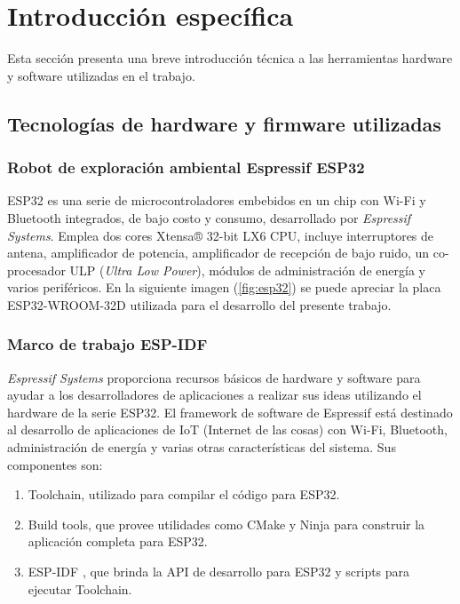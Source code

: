 \chapter{Introducción específica} %

\label{Chapter2}



Esta sección presenta una breve introducción técnica a las herramientas hardware y software utilizadas en el trabajo.

\section{Tecnologías de hardware y firmware utilizadas}


\subsection{Robot de exploración ambiental Espressif ESP32}


ESP32 \cite{ESP32} es una serie de microcontroladores embebidos en un chip con Wi-Fi y Bluetooth integrados, de bajo costo y consumo, desarrollado por \textit{Espressif Systems}. Emplea dos cores Xtensa® 32-bit LX6 CPU, incluye interruptores de antena, amplificador de potencia, amplificador de recepción de bajo ruido, un co-procesador ULP (\textit{Ultra Low Power}), módulos de administración de energía y varios periféricos.
En la siguiente imagen (\ref{fig:esp32}) se puede apreciar la placa ESP32-WROOM-32D \cite{ESP32_wroom_32d_datasheet} utilizada para el desarrollo del presente trabajo.



\subsection{Marco de trabajo ESP-IDF}

\textit{Espressif Systems} proporciona recursos básicos de hardware y software para ayudar a los desarrolladores de aplicaciones a realizar sus ideas utilizando el hardware de la serie ESP32. El framework de software de Espressif está destinado al desarrollo de aplicaciones de IoT (Internet de las cosas) con Wi-Fi, Bluetooth, administración de energía y varias otras características del sistema.
Sus componentes son:
\begin{enumerate}
	\item Toolchain, utilizado para compilar el código para ESP32.
	\item Build tools, que provee utilidades como CMake \cite{cmake_website} y Ninja \cite{ninja_website} para construir la aplicación completa para ESP32.
	\item ESP-IDF \cite{ESPIDF_home}, que brinda la API de desarrollo para ESP32 y scripts para ejecutar Toolchain.
	
\end{enumerate}

